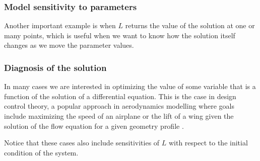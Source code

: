 


    \subsubsection{Model sensitivity to parameters}
    Another important example is when $L$ returns the value of the solution at one or many points, which is useful when we want to know how the solution itself changes as we move the parameter values. 
    \subsubsection{Diagnosis of the solution}
    
    In many cases we are interested in optimizing the value of some variable that is a function of the solution of a differential equation. This is the case in design control theory, a popular approach in aerodynamics modelling where goals include maximizing the speed of an airplane or the lift of a wing given the solution of the flow equation for a given geometry profile \cite{Jameson_1988}. 

Notice that these cases also include sensitivities of $L$ with respect to the initial condition of the system.


